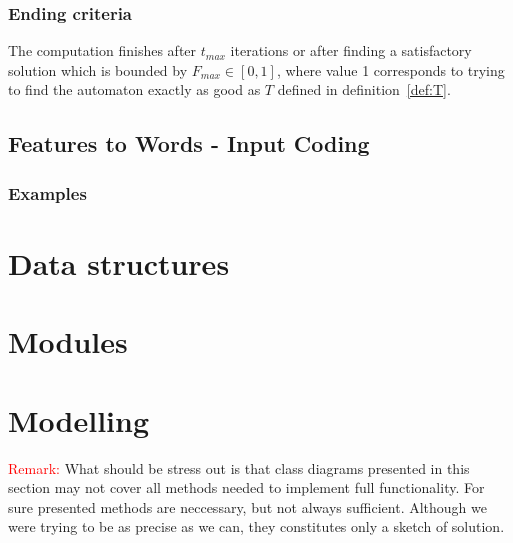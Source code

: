 \documentclass{article}
\begin{document}
\subsubsection{Ending criteria}
The computation finishes after $t_{max}$ iterations or after finding a satisfactory solution which is bounded by $F_{max} \in [0,1]$, where value 1 corresponds to trying to find the automaton exactly as good as $T$ defined in definition~\ref{def:T}.

\subsection{Features to Words - Input Coding}



\subsubsection{Examples}




\section{Data structures}




\section{Modules}
	



\section{Modelling}

\textcolor{red}{Remark:} What should be stress out is that class diagrams presented in this section may not cover all methods needed to implement full functionality. For sure presented methods are neccessary, but not always sufficient. Although we were trying to be as precise as we can, they constitutes only a sketch of solution.
\end{document}
